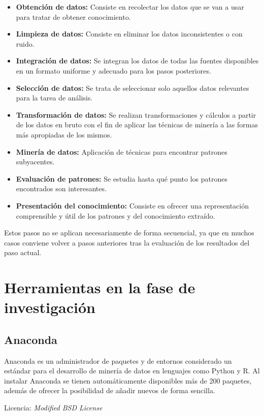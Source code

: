 \begin{itemize}
	\item \textbf{Obtención de datos:} Consiste en recolectar los datos que se van a usar para tratar de obtener conocimiento. 
	\item \textbf{Limpieza de datos:} Consiste en eliminar los datos inconsistentes o con ruido.  
	\item \textbf{Integración de datos:} Se integran los datos de todas las fuentes disponibles en un formato uniforme y adecuado para los pasos posteriores. 
	\item \textbf{Selección de datos:} Se trata de seleccionar solo aquellos datos relevantes para la tarea de análisis.  
	\item \textbf{Transformación de datos:} Se realizan transformaciones y cálculos a partir de los datos en bruto con el fin de aplicar las técnicas de minería a las formas más apropiadas de los mismos. 
	\item \textbf{Minería de datos:} Aplicación de técnicas para encontrar patrones subyacentes. 
	\item \textbf{Evaluación de patrones:} Se estudia hasta qué punto los patrones encontrados son interesantes. 
	\item \textbf{Presentación del conocimiento:} Consiste en ofrecer una representación comprensible y útil de los patrones y del conocimiento extraído. 
\end{itemize}

Estos pasos no se aplican necesariamente de forma secuencial, ya que en muchos casos conviene volver a pasos anteriores tras la evaluación de los resultados del paso actual. 

\section{Herramientas en la fase de investigación}

\subsection{Anaconda}

Anaconda es un administrador de paquetes y de entornos considerado un estándar para el desarrollo de minería de datos en lenguajes como Python y R. Al instalar Anaconda se tienen automáticamente disponibles más de 200 paquetes, además de ofrecer la posibilidad de añadir nuevos de forma sencilla. 

Licencia: \textit{Modified BSD License}

